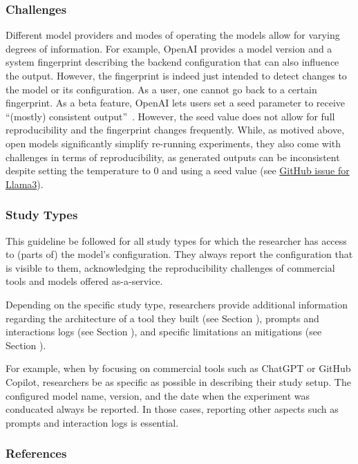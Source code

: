 \subsubsection{Challenges}

Different model providers and modes of operating the models allow for varying degrees of information.
For example, OpenAI provides a model version and a system fingerprint describing the backend configuration that can also influence the output.
However, the fingerprint is indeed just intended to detect changes to the model or its configuration.
As a user, one cannot go back to a certain fingerprint.
As a beta feature, OpenAI lets users set a seed parameter to receive ``(mostly) consistent output''~\cite{OpenAI23}.
However, the seed value does not allow for full reproducibility and the fingerprint changes frequently. 
While, as motived above, open models significantly simplify re-running experiments, they also come with challenges in terms of reproducibility, as generated outputs can be inconsistent despite setting the temperature to 0 and using a seed value (see \href{https://github.com/ollama/ollama/issues/5321}{GitHub issue for Llama3}).


\subsubsection{Study Types}

This guideline \must be followed for all study types for which the researcher has access to (parts of) the model's configuration.
They \must always report the configuration that is visible to them, acknowledging the reproducibility challenges of commercial tools and models offered as-a-service. 

Depending on the specific study type, researchers \should provide additional information regarding the architecture of a tool they built (see Section \toolarchitecture), prompts and interactions logs (see Section \prompts), and specific limitations an mitigations (see Section \limitationsmitigations).


For example, when \llmusage by focusing on commercial tools such as ChatGPT or GitHub Copilot, researchers \must be as specific as possible in describing their study setup.
The configured model name, version, and the date when the experiment was conducated \must always be reported.
In those cases, reporting other aspects such as prompts and interaction logs is essential.


\subsubsection{References}





